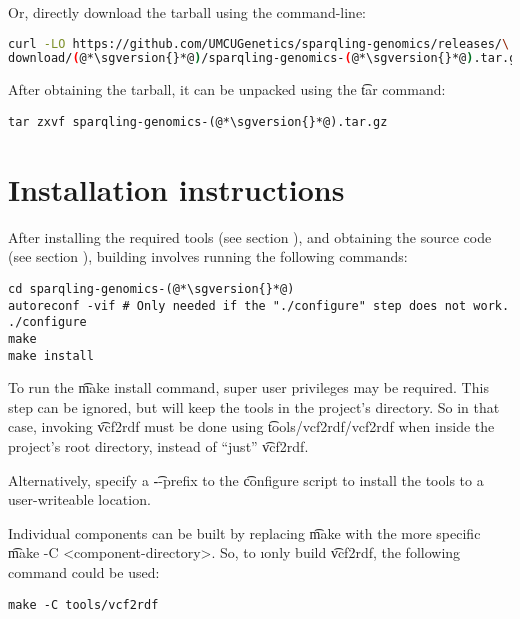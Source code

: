   Or, directly download the tarball using the command-line:
\begin{siderules}
\begin{lstlisting}[language=bash]
curl -LO https://github.com/UMCUGenetics/sparqling-genomics/releases/\
download/(@*\sgversion{}*@)/sparqling-genomics-(@*\sgversion{}*@).tar.gz
\end{lstlisting}
\end{siderules}

  After obtaining the tarball, it can be unpacked using the \t{tar}
  command:

\begin{siderules}
\begin{lstlisting}
tar zxvf sparqling-genomics-(@*\sgversion{}*@).tar.gz
\end{lstlisting}
\end{siderules}

\section{Installation instructions}

  After installing the required tools (see section ),
  and obtaining the source code (see section \refer{sec:obtaining-tarball}),
  building involves running the following commands:

\begin{siderules}
\begin{lstlisting}
cd sparqling-genomics-(@*\sgversion{}*@)
autoreconf -vif # Only needed if the "./configure" step does not work.
./configure
make
make install
\end{lstlisting}
\end{siderules}

  To run the \t{make install} command, super user privileges may be
  required.  This step can be ignored, but will keep the tools in the project's
  directory.  So in that case, invoking \t{vcf2rdf} must be done using
  \t{tools/vcf2rdf/vcf2rdf} when inside the project's root directory,
  instead of ``just'' \t{vcf2rdf}.

  Alternatively, specify a \t{-{}-prefix} to the \t{configure}
  script to install the tools to a user-writeable location.

  Individual components can be built by replacing \t{make} with the
  more specific \t{make -C <component-directory>}.  So, to \i{only}
  build \t{vcf2rdf}, the following command could be used:

\begin{siderules}
\begin{verbatim}
make -C tools/vcf2rdf
\end{verbatim}
\end{siderules}

